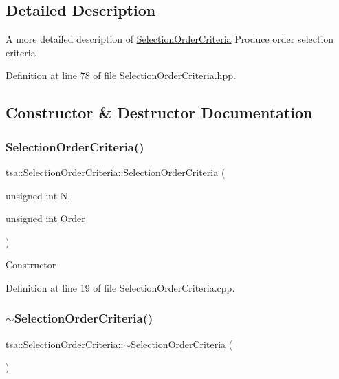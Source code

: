 \subsection{Detailed Description}
A more detailed description of \hyperlink{classtsa_1_1_selection_order_criteria}{Selection\+Order\+Criteria} Produce order selection criteria 

Definition at line 78 of file Selection\+Order\+Criteria.\+hpp.



\subsection{Constructor \& Destructor Documentation}
\mbox{\label{classtsa_1_1_selection_order_criteria_a0f94155c1a172ae6368f8ffdc33092e9}} 
\subsubsection{\texorpdfstring{Selection\+Order\+Criteria()}{SelectionOrderCriteria()}}
{\footnotesize\ttfamily tsa\+::\+Selection\+Order\+Criteria\+::\+Selection\+Order\+Criteria (\begin{DoxyParamCaption}\item[{unsigned int}]{N,  }\item[{unsigned int}]{Order }\end{DoxyParamCaption})}

Constructor 

Definition at line 19 of file Selection\+Order\+Criteria.\+cpp.

\mbox{\label{classtsa_1_1_selection_order_criteria_a5c3fd909a347a327ecc326bd2be51893}} 
\subsubsection{\texorpdfstring{$\sim$\+Selection\+Order\+Criteria()}{~SelectionOrderCriteria()}}
{\footnotesize\ttfamily tsa\+::\+Selection\+Order\+Criteria\+::$\sim$\+Selection\+Order\+Criteria (\begin{DoxyParamCaption}{ }\end{DoxyParamCaption})\hspace{0.3cm}{\ttfamily [virtual]}}

